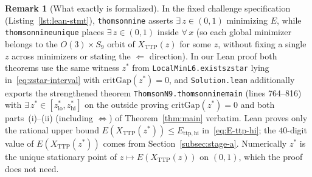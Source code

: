 \documentclass[11pt,reqno]{amsart}
\renewcommand{\_}{\origunderscore\allowbreak}
\theoremstyle{definition}
\newtheorem{remark}[theorem]{Remark}
\newcommand{\TTP}{X_{\mathrm{TTP}}}
\newcommand{\Ettphi}{E_{\mathrm{ttp,hi}}}
\begin{document}
\begin{remark}[What exactly is formalized]\label{rem:formal-scope}
In the fixed challenge specification (Listing~\ref{lst:lean-stmt}), \texttt{thomson\_nine} asserts $\exists\,z \in (0,1)$ minimizing $E$, while \texttt{thomson\_nine\_unique} places $\exists\,z \in (0,1)$ inside $\forall\,x$ (so each global minimizer belongs to the $O(3)\times S_9$ orbit of $\TTP(z)$ for some $z$, without fixing a single $z$ across minimizers or stating the $\Leftarrow$ direction). In our Lean proof both theorems use the same witness $z^*$ from \texttt{LocalMinL6.exists\_z\_star} lying in~\eqref{eq:zstar-interval} with $\mathrm{critGap}(z^*) = 0$, and \texttt{Solution.lean} additionally exports the strengthened theorem \texttt{ThomsonN9.thomson\_nine\_main} (lines 764--816) with $\exists\,z^* \in [z^*_{\mathrm{lo}}, z^*_{\mathrm{hi}}]$ on the outside proving $\mathrm{critGap}(z^*) = 0$ and both parts~(i)--(ii) (including $\iff$) of Theorem~\ref{thm:main} verbatim. Lean proves only the rational upper bound $E(\TTP(z^*)) \le \Ettphi$ in~\eqref{eq:E-ttp-hi}; the $40$-digit value of $E(\TTP(z^*))$ comes from Section~\ref{subsec:stage-a}. Numerically $z^*$ is the unique stationary point of $z \mapsto E(\TTP(z))$ on $(0,1)$, which the proof does not need.
\end{remark}
\end{document}
